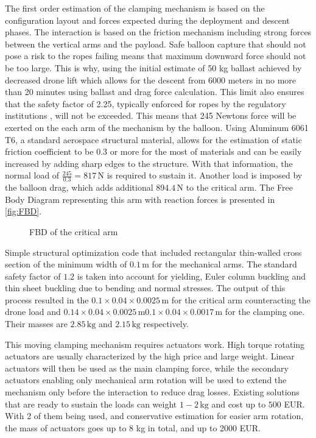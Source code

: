 The first order estimation of the clamping mechanism is based on the configuration layout and forces expected during the deployment and descent phases. The interaction is based on the friction mechanism including strong forces between the vertical arms and the payload. Safe balloon capture that should not pose a risk to the ropes failing means that maximum downward force should not be too large. This is why, using the initial estimate of 50 kg ballast achieved by decreased drone lift which allows for the descent from 6000 meters in no more than 20 minutes using ballast and drag force calculation. This limit also ensures that the safety factor of 2.25, typically enforced for ropes by the regulatory institutions \cite{EASA2009EuropeanCS-31HB}, will not be exceeded. This means that 245 Newtons force will be exerted on the each arm of the mechanism by the balloon. Using Aluminum 6061 T6, a standard aerospace structural material, allows for the estimation of static friction coefficient to be 0.3 or more for the most of materials and can be easily increased by adding sharp edges to the structure. With that information, the normal load of $
\frac{245}{0.3}=817 \, \text{N}$ is required to sustain it. Another load is imposed by the balloon drag, which adds additional $894.4 \, \text{N}$ to the critical arm. The Free Body Diagram representing this arm with reaction forces is presented in \autoref{fig:FBD}.

\begin{figure}[h!]
    \centering
    \caption{FBD of the critical arm}
    \label{fig:FBD}
\end{figure}
Simple structural optimization code that included rectangular thin-walled cross section of the minimum width of $0.1 \, \text{m}$ for the mechanical arms. The standard safety factor of $1.2$ is taken into account for yielding, Euler column buckling and thin sheet buckling due to bending and normal stresses.  The output of this process resulted in the $0.1 \times0.04\times0.0025 \, \text{m}$ for the critical arm counteracting the drone load and $0.14 \times0.04\times0.0025 \, \text{m}$$0.1 \times0.04\times0.0017 \, \text{m}$ for the clamping one. Their masses are $2.85 \, \text{kg}$ and $2.15 \, \text{kg}$ respectively.

This moving clamping mechanism requires actuators work. High torque rotating actuators are usually characterized by the high price and large weight. Linear actuators will then be used as the main clamping force, while the secondary actuators enabling only mechanical arm rotation will be used to extend the mechanism only before the interaction to reduce drag losses. Existing solutions that are ready to sustain the loads can weight $1-2 \, \text{kg}$ and cost up to $500$ EUR. With 2 of them being used, and conservative estimation for easier arm rotation, the mass of actuators goes up to 8 kg in total, and up to 2000 EUR.   







